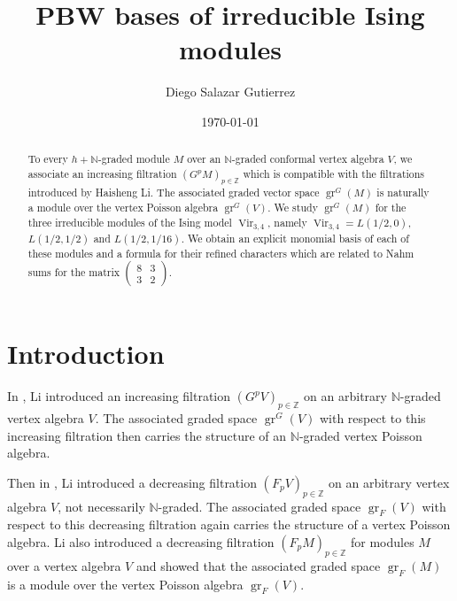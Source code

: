 \documentclass[a4paper, 12pt, reqno]{amsart}
\theoremstyle{remark}
\numberwithin{equation}{subsection}
\DeclareMathOperator{\Vir}{Vir}
\DeclareMathOperator{\gr}{gr}
\begin{document}
\begin{abstract}
  To every $h + \mathbb{N}$-graded module $M$ over an $\mathbb{N}$-graded conformal vertex algebra $V$, we associate an increasing filtration $(G^pM)_{p \in \mathbb{Z}}$ which is compatible with the filtrations introduced by Haisheng Li.
  The associated graded vector space $\gr^G(M)$ is naturally a module over the vertex Poisson algebra $\gr^G(V)$.
  We study $\gr^G(M)$ for the three irreducible modules of the Ising model $\Vir_{3, 4}$, namely $\Vir_{3,4} = L(1/2, 0)$, $L(1/2, 1/2)$ and $L(1/2, 1/16)$.
  We obtain an explicit monomial basis of each of these modules and a formula for their refined characters which are related to Nahm sums for the matrix $\left(\begin{smallmatrix} 8 & 3 \\ 3 & 2 \end{smallmatrix}\right)$.
\end{abstract}

\title{PBW bases of irreducible Ising modules}
\author{Diego Salazar Gutierrez}
\address{Instituto de Matemática Pura e Aplicada, Rio de Janeiro, RJ, Brazil}
\date{\today}
\maketitle

\tableofcontents

\section{Introduction}
\label{sec:introduction}

In \cite{li_vertex_2004}, Li introduced an increasing filtration $(G^pV)_{p \in \mathbb{Z}}$ on an arbitrary $\mathbb{N}$-graded vertex algebra $V$.
The associated graded space $\gr^G(V)$ with respect to this increasing filtration then carries the structure of an $\mathbb{N}$-graded vertex Poisson algebra.

Then in \cite{li_abelianizing_2005}, Li introduced a decreasing filtration $(F_pV)_{p \in \mathbb{Z}}$ on an arbitrary vertex algebra $V$, not necessarily $\mathbb{N}$-graded.
The associated graded space $\gr_F(V)$ with respect to this decreasing filtration again carries the structure of a vertex Poisson algebra.
Li also introduced a decreasing filtration $(F_pM)_{p \in \mathbb{Z}}$ for modules $M$ over a vertex algebra $V$ and showed that the associated graded space $\gr_F(M)$ is a module over the vertex Poisson algebra $\gr_F(V)$.
\end{document}
